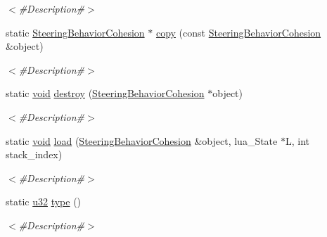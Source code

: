 \begin{DoxyCompactItemize}
\begin{DoxyCompactList}\small\item\em $<$\#\+Description\#$>$ \end{DoxyCompactList}\item 
static \mbox{\hyperlink{classnjli_1_1_steering_behavior_cohesion}{Steering\+Behavior\+Cohesion}} $\ast$ \mbox{\hyperlink{classnjli_1_1_steering_behavior_cohesion_a6685c161ed3cb8a28b47542361c2fe96}{copy}} (const \mbox{\hyperlink{classnjli_1_1_steering_behavior_cohesion}{Steering\+Behavior\+Cohesion}} \&object)
\begin{DoxyCompactList}\small\item\em $<$\#\+Description\#$>$ \end{DoxyCompactList}\item 
static \mbox{\hyperlink{_thread_8h_af1e856da2e658414cb2456cb6f7ebc66}{void}} \mbox{\hyperlink{classnjli_1_1_steering_behavior_cohesion_af19446195cf0c7c8787eac2dced3ebb2}{destroy}} (\mbox{\hyperlink{classnjli_1_1_steering_behavior_cohesion}{Steering\+Behavior\+Cohesion}} $\ast$object)
\begin{DoxyCompactList}\small\item\em $<$\#\+Description\#$>$ \end{DoxyCompactList}\item 
static \mbox{\hyperlink{_thread_8h_af1e856da2e658414cb2456cb6f7ebc66}{void}} \mbox{\hyperlink{classnjli_1_1_steering_behavior_cohesion_ac0a3ef2a68114c4b4a78edead64ea566}{load}} (\mbox{\hyperlink{classnjli_1_1_steering_behavior_cohesion}{Steering\+Behavior\+Cohesion}} \&object, lua\+\_\+\+State $\ast$L, int stack\+\_\+index)
\begin{DoxyCompactList}\small\item\em $<$\#\+Description\#$>$ \end{DoxyCompactList}\item 
static \mbox{\hyperlink{_util_8h_a10e94b422ef0c20dcdec20d31a1f5049}{u32}} \mbox{\hyperlink{classnjli_1_1_steering_behavior_cohesion_ab0d4fc92a137a32d7f82620427faf1f2}{type}} ()
\begin{DoxyCompactList}\small\item\em $<$\#\+Description\#$>$ \end{DoxyCompactList}\end{DoxyCompactItemize}
